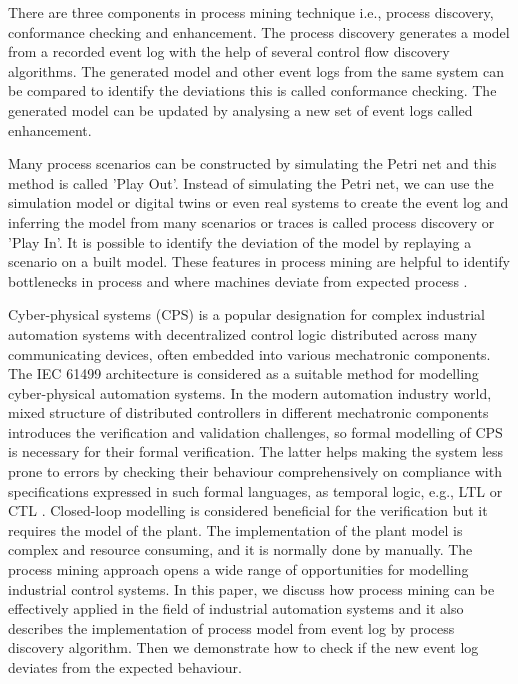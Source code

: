 \begin{bibunit}
	There are three components in process mining technique \cite{van2012process2} i.e., process discovery, conformance checking and enhancement. The process discovery generates a model from a recorded event log with the help of several control flow discovery algorithms. The generated model and other event logs from the same system can be compared to identify the deviations this is called conformance checking. The generated model can be updated by analysing a new set of event logs called enhancement.
   
   Many process scenarios can be constructed by simulating the Petri net \cite{petri1962} and this method is called 'Play Out'. Instead of simulating the Petri net, we can use the simulation model or digital twins or even real systems to create the event log and inferring the model from many scenarios or traces is called process discovery or 'Play In'. It is possible to identify the deviation of the model by replaying a scenario on a built model. These features in process mining are helpful to identify bottlenecks in process and where machines deviate from expected process \cite{aalst2011process}.
   
   
	
	Cyber-physical systems (CPS) \cite{lee2017introduction} is a popular designation for complex industrial automation systems with decentralized control logic distributed across many communicating devices, often embedded into various mechatronic components. The IEC 61499 architecture \cite{iec61499part12012} is considered as a suitable method for modelling cyber-physical automation systems. In the modern automation industry world, mixed structure of distributed controllers in different mechatronic components introduces the verification and validation challenges, so formal modelling of CPS is necessary for their formal verification. The latter helps making the system less prone to errors by checking their behaviour comprehensively on compliance with specifications expressed in such formal languages, as temporal logic, e.g., LTL or CTL \cite{yoong2015verification}. Closed-loop modelling is considered beneficial for the verification but it requires the model of the plant. The implementation of the plant model is complex and resource consuming, and it is normally done by manually. The process mining approach opens a wide range of opportunities for modelling industrial control systems. In this paper, we discuss how process mining can be effectively applied in the field of industrial automation systems and it also describes the implementation of process model from event log by process discovery algorithm. Then we demonstrate how to check if the new event log deviates from the expected behaviour.
   

\end{bibunit}
